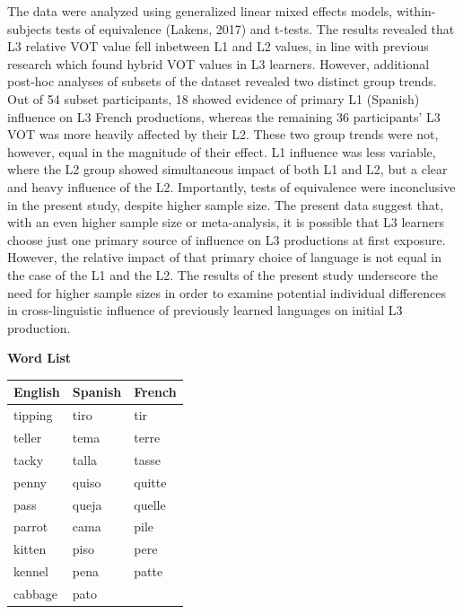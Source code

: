 \documentclass[
  12pt,
]{article}
\begin{document}
The data were analyzed using generalized linear mixed effects models,
within-subjects tests of equivalence (Lakens, 2017) and t-tests. The
results revealed that L3 relative VOT value fell inbetween L1 and L2
values, in line with previous research which found hybrid VOT values in
L3 learners. However, additional post-hoc analyses of subsets of the
dataset revealed two distinct group trends. Out of 54 subset
participants, 18 showed evidence of primary L1 (Spanish) influence on L3
French productions, whereas the remaining 36 participants' L3 VOT was
more heavily affected by their L2. These two group trends were not,
however, equal in the magnitude of their effect. L1 influence was less
variable, where the L2 group showed simultaneous impact of both L1 and
L2, but a clear and heavy influence of the L2. Importantly, tests of
equivalence were inconclusive in the present study, despite higher
sample size. The present data suggest that, with an even higher sample
size or meta-analysis, it is possible that L3 learners choose just one
primary source of influence on L3 productions at first exposure.
However, the relative impact of that primary choice of language is not
equal in the case of the L1 and the L2. The results of the present study
underscore the need for higher sample sizes in order to examine
potential individual differences in cross-linguistic influence of
previously learned languages on initial L3 production.

\newpage

\textbf{Word List}

\begin{longtable}[]{@{}lll@{}}
\toprule
English & Spanish & French \\
\midrule
\endhead
tipping & tiro & tir \\
teller & tema & terre \\
tacky & talla & tasse \\
penny & quiso & quitte \\
pass & queja & quelle \\
parrot & cama & pile \\
kitten & piso & pere \\
kennel & pena & patte \\
cabbage & pato & \\
\bottomrule
\end{longtable}
\end{document}
